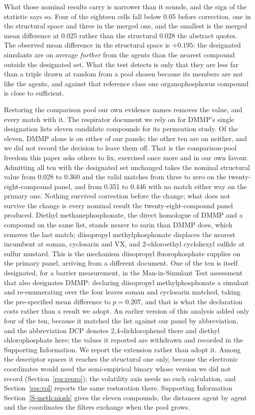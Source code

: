 \documentclass[journal=ancham,manuscript=article,margin=1in]{achemso}
\begin{document}
What those nominal results carry is narrower than it sounds, and the sign of
the statistic says so. Four of the eighteen cells fall below 0.05 before
correction, one in the structural space and three in the merged one, and the
smallest is the merged mean difference at 0.025 rather than the structural
0.028 the abstract quotes. The observed mean difference in the structural space
is $+0.195$: the designated simulants are on average
\emph{further} from the agents than the nearest compound outside the designated
set. What the test detects is only that they are less far than a triple drawn at
random from a pool chosen because its members are not like the agents, and
against that reference class one organophosphorus compound is close to
sufficient.

Restoring the comparison pool our own evidence names removes the value, and
every match with it. The respirator document we rely on for DMMP's single
designation lists eleven candidate compounds for its permeation study. Of the
eleven, DMMP alone is on either of our panels; the other ten are on neither, and
we did not record the decision to leave them off. That is the comparison-pool
freedom this paper asks others to fix, exercised once more and in our own
favour. Admitting all ten with the designated set unchanged takes the nominal
structural value from 0.028 to 0.360 and the valid matches from three to zero on
the twenty-eight-compound panel, and from 0.351 to 0.446 with no match either
way on the primary one. Nothing survived correction before the change; what does
not survive the change is every nominal result the twenty-eight-compound panel
produced. Diethyl methanephosphonate, the direct homologue of DMMP and a
compound on the same list, stands nearer to sarin than DMMP does, which removes
the last match; diisopropyl methylphosphonate displaces the nearest incumbent at
soman, cyclosarin and VX, and 2-chloroethyl cyclohexyl sulfide at sulfur
mustard. This
is the mechanism diisopropyl fluorophosphate supplies on the primary panel,
arriving from a different document. One of the ten is itself designated, for a
barrier measurement, in the Man-in-Simulant Test assessment that also
designates DMMP: declaring diisopropyl methylphosphonate a simulant and
re-enumerating over the four leaves soman and cyclosarin matched, taking the
pre-specified mean difference to $p = 0.207$, and that is what the declaration
costs rather than a result we adopt. An earlier version of this analysis added
only four of the ten, because it matched the list against our panel by
abbreviation, and the abbreviation DCP denotes 2,4-dichlorophenol there and
diethyl chlorophosphate here; the values it reported are withdrawn and recorded
in the Supporting Information. We report the
extension rather than adopt it. Among the descriptor spaces it reaches the
structural one only, because the electronic coordinates would need the
semi-empirical binary whose version we did not record
(Section~\ref{res:repro}); the volatility axis needs no such calculation, and
Section~\ref{res:vol} reports the same restoration there. Supporting Information
Section~\ref{S-meth:niosh} gives the eleven compounds, the distances agent by
agent and the coordinates the filters exchange when the pool grows.
\end{document}
